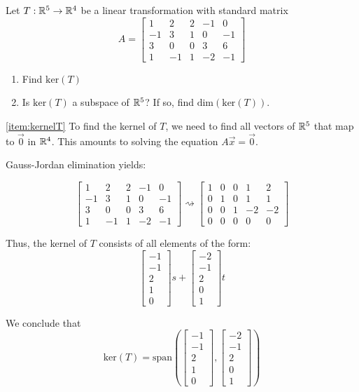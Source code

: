 \documentclass{ximera}
\begin{document}
\begin{example}\label{ex:kernel} Let $T:\mathbb{R}^5\rightarrow \mathbb{R}^4$ be a linear transformation with standard matrix $$A=\begin{bmatrix}1 & 2 & 2 &-1 & 0\\-1 & 3 & 1 & 0 & -1\\3 & 0 & 0 & 3 & 6\\ 1 & -1 & 1 & -2 & -1\end{bmatrix}$$
\begin{enumerate}
\item \label{item:kernelT}
Find $\mbox{ker}(T)$
\item \label{item:dimkernelT}
Is $\mbox{ker}(T)$ a subspace of $\mathbb{R}^5$?  If so, find $\mbox{dim}(\mbox{ker}(T))$.
\end{enumerate}
\begin{explanation}
\ref{item:kernelT} To find the kernel of $T$, we need to find all vectors of $\mathbb{R}^5$ that map to $\vec{0}$ in $\mathbb{R}^4$.  This amounts to solving the equation $A\vec{x}=\vec{0}$.

Gauss-Jordan elimination yields:

$$\begin{bmatrix}1 & 2 & 2 &-1 & 0\\-1 & 3 & 1 & 0 & -1\\3 & 0 & 0 & 3 & 6\\ 1 & -1 & 1 & -2 & -1\end{bmatrix}  \rightsquigarrow \begin{bmatrix} 1 & 0 & 0 & 1 & 2\\0 & 1 & 0 & 1 & 1\\0 & 0 & 1 & -2 & -2\\ 0 & 0 & 0 & 0 & 0 \end{bmatrix}$$

Thus, the kernel of $T$ consists of all elements of the form:
$$\begin{bmatrix}-1\\-1\\2\\1\\0\end{bmatrix}s+\begin{bmatrix}-2\\-1\\2\\0\\1\end{bmatrix}t$$

We conclude that 
$$\mbox{ker}(T)=\mbox{span}\left(\begin{bmatrix}-1\\-1\\2\\1\\0\end{bmatrix}, \begin{bmatrix}-2\\-1\\2\\0\\1\end{bmatrix}\right)$$


\end{explanation}
\end{example}
\end{document}
